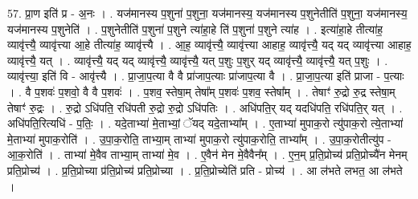 \documentclass[17pt]{extarticle}
\begin{document}
57. प्रा॒ण इति॑ प्र - अ॒नः । . यज॑मानस्य प॒शुना॑ प॒शुना॒ यज॑मानस्य॒ यज॑मानस्य प॒शुनेतीति॑ प॒शुना॒ यज॑मानस्य॒ यज॑मानस्य प॒शुनेति॑ । . प॒शुनेतीति॑ प॒शुना॑ प॒शुने त्या॑हा॒हे ति॑ प॒शुना॑ प॒शुने त्या॑ह । . इत्या॑हा॒हे तीत्या॑ह॒ व्यावृ॑त्त्यै॒ व्यावृ॑त्त्या आ॒हे तीत्या॑ह॒ व्यावृ॑त्त्यै । . आ॒ह॒ व्यावृ॑त्त्यै॒ व्यावृ॑त्त्या आहाह॒ व्यावृ॑त्त्यै॒ यद् यद् व्यावृ॑त्त्या आहाह॒ व्यावृ॑त्त्यै॒ यत् । . व्यावृ॑त्त्यै॒ यद् यद् व्यावृ॑त्त्यै॒ व्यावृ॑त्त्यै॒ यत् प॒शुः प॒शुर् यद् व्यावृ॑त्त्यै॒ व्यावृ॑त्त्यै॒ यत् प॒शुः । . व्यावृ॑त्त्या॒ इति॑ वि - आवृ॑त्त्यै । . प्रा॒जा॒प॒त्या वै वै प्रा॑जाप॒त्याः प्रा॑जाप॒त्या वै । . प्रा॒जा॒प॒त्या इति॑ प्राजा - प॒त्याः । . वै प॒शवः॑ प॒शवो॒ वै वै प॒शवः॑ । . प॒शव॒ स्तेषा॒म् तेषा᳚म् प॒शवः॑ प॒शव॒ स्तेषा᳚म् । . तेषाꣳ॑ रु॒द्रो रु॒द्र स्तेषा॒म् तेषाꣳ॑ रु॒द्रः । . रु॒द्रो ऽधि॑पति॒ रधि॑पती रु॒द्रो रु॒द्रो ऽधि॑पतिः । . अधि॑पति॒र् यद् यदधि॑पति॒ रधि॑पति॒र् यत् । . अधि॑पति॒रित्यधि॑ - प॒तिः॒ । . यदे॒ताभ्या॑ मे॒ताभ्यां॒ ॅयद् यदे॒ताभ्या᳚म् । . ए॒ताभ्या॑ मुपाक॒रो त्यु॑पाक॒रो त्ये॒ताभ्या॑ मे॒ताभ्या॑ मुपाक॒रोति॑ । . उ॒पा॒क॒रोति॒ ताभ्या॒म् ताभ्या॑ मुपाक॒रो त्यु॑पाक॒रोति॒ ताभ्या᳚म् । . उ॒पा॒क॒रोतीत्यु॑प - आ॒क॒रोति॑ । . ताभ्या॑ मे॒वैव ताभ्या॒म् ताभ्या॑ मे॒व । . ए॒वैन॑ मेन मे॒वैवैन᳚म् । . ए॒न॒म् प्र॒ति॒प्रोच्य॑ प्रति॒प्रोच्यै॑न मेनम् प्रति॒प्रोच्य॑ । . प्र॒ति॒प्रोच्या प्र॑ति॒प्रोच्य॑ प्रति॒प्रोच्या । . प्र॒ति॒प्रोच्येति॑ प्रति - प्रोच्य॑ । . आ ल॑भते लभत॒ आ ल॑भते । \newline
\end{document}
